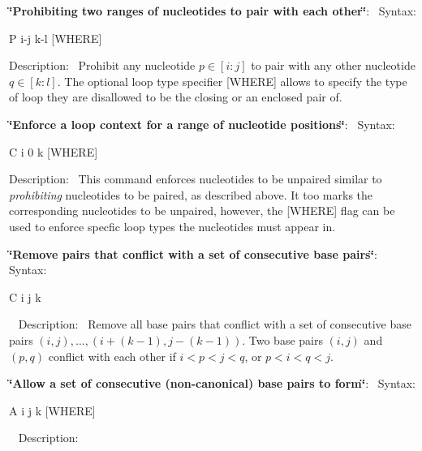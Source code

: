 \begin{DoxyEnumerate}
\item {\bfseries \char`\"{}\+Prohibiting two ranges of nucleotides to pair with each other\char`\"{}}\+:~\newline
 Syntax\+:\begin{DoxyVerb}P i-j k-l [WHERE] \end{DoxyVerb}
 Description\+:~\newline
 Prohibit any nucleotide $ p \in [i:j] $ to pair with any other nucleotide $ q \in [k:l] $. The optional loop type specifier {\ttfamily }\mbox{[}W\+H\+E\+RE\mbox{]} allows to specify the type of loop they are disallowed to be the closing or an enclosed pair of.
\item {\bfseries \char`\"{}\+Enforce a loop context for a range of nucleotide positions\char`\"{}}\+:~\newline
 Syntax\+:\begin{DoxyVerb}C i 0 k [WHERE] \end{DoxyVerb}
 Description\+:~\newline
 This command enforces nucleotides to be unpaired similar to {\itshape prohibiting} nucleotides to be paired, as described above. It too marks the corresponding nucleotides to be unpaired, however, the {\ttfamily }\mbox{[}W\+H\+E\+RE\mbox{]} flag can be used to enforce specfic loop types the nucleotides must appear in.
\item {\bfseries \char`\"{}\+Remove pairs that conflict with a set of consecutive base pairs\char`\"{}}\+:~\newline
 Syntax\+:\begin{DoxyVerb}C i j k \end{DoxyVerb}
~\newline
 Description\+:~\newline
 Remove all base pairs that conflict with a set of consecutive base pairs $ (i,j), \ldots, (i+(k-1), j-(k-1)) $. Two base pairs $ (i,j) $ and $ (p,q) $ conflict with each other if $ i < p < j < q $, or $ p < i < q < j $.
\item {\bfseries \char`\"{}\+Allow a set of consecutive (non-\/canonical) base pairs to form\char`\"{}}\+:~\newline
 Syntax\+:
\begin{DoxyCode}
A i j k [WHERE] 
\end{DoxyCode}
~\newline
 Description\+:~\newline

\end{DoxyEnumerate}
